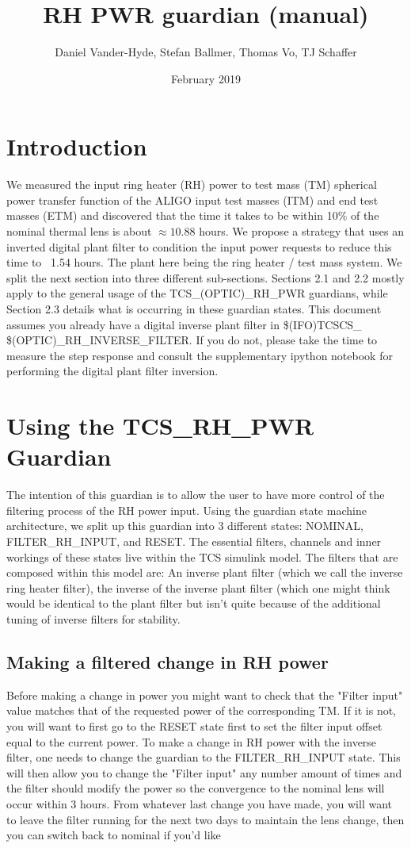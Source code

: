 \documentclass{article}
\title{RH PWR guardian (manual)}
\author{Daniel Vander-Hyde, Stefan Ballmer, Thomas Vo, TJ Schaffer}
\date{February 2019}
\begin{document}
\maketitle

\section{Introduction}
We measured the input ring heater (RH) power to test mass (TM) spherical power transfer function of the ALIGO input test masses (ITM) and end test masses (ETM) and discovered that the time it takes to be within 10\% of the nominal thermal lens is about $\approx 10.88$ hours. We propose a strategy that uses an inverted digital plant filter to condition the input power requests to reduce this time to ~1.54 hours. The plant here being the ring heater / test mass system. We split the next section into three different sub-sections. Sections 2.1 and 2.2 mostly apply to the general usage of the TCS\_(OPTIC)\_RH\_PWR guardians, while Section 2.3 details what is occurring in these guardian states. This document assumes you already have a digital inverse plant filter in \$(IFO)TCSCS\_ \$(OPTIC)\_RH\_INVERSE\_FILTER. If you do not, please take the time to measure the step response and consult the supplementary ipython notebook for performing the digital plant filter inversion. 

\section{Using the TCS\_RH\_PWR Guardian}
The intention of this guardian is to allow the user to have more control of the filtering process of the RH power input. Using the guardian state machine architecture, we split up this guardian into 3 different states: NOMINAL, FILTER\_RH\_INPUT, and RESET. The essential filters, channels and inner workings of these states live within the TCS simulink model. The filters that are composed within this model are: An inverse plant filter (which we call the inverse ring heater filter), the inverse of the inverse plant filter (which one might think would be identical to the plant filter but isn't quite because of the additional tuning of inverse filters for stability.

\subsection{Making a filtered change in RH power}
Before making a change in power you might want to check that the "Filter input" value matches that of the requested power of the corresponding TM. If it is not, you will want to first go to the RESET state first to set the filter input offset equal to the current power.  
To make a change in RH power with the inverse filter, one needs to change the guardian to the FILTER\_RH\_INPUT state. This will then allow you to change the "Filter input" any number amount of times and the filter should modify the power so the convergence to the nominal lens will occur within 3 hours. From whatever last change you have made, you will want to leave the filter running for the next two days to maintain the lens change, then you can switch back to nominal if you'd like
\end{document}
